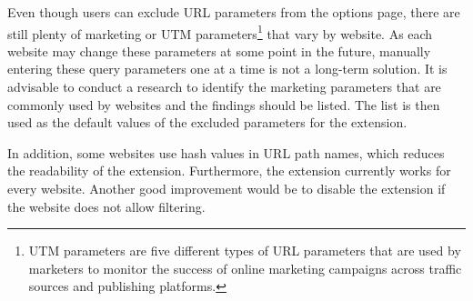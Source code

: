 Even though users can exclude URL parameters from the options page, there are still plenty of marketing or UTM parameters\footnote{UTM parameters are five different types of URL parameters that are used by marketers to monitor the success of online marketing campaigns across traffic sources and publishing platforms.} that vary by website. As each website may change these parameters at some point in the future, manually entering these query parameters one at a time is not a long-term solution. It is advisable to conduct a research to identify the marketing parameters that are commonly used by websites and the findings should be listed. The list is then used as the default values of the excluded parameters for the extension.

In addition, some websites use hash values in URL path names, which reduces the readability of the extension. Furthermore, the extension currently works for every website. Another good improvement would be to disable the extension if the website does not allow filtering.
